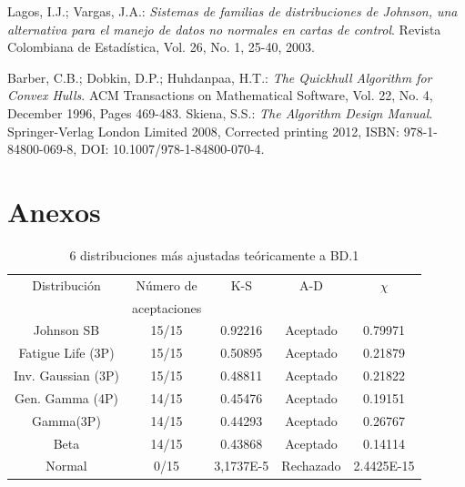 \documentclass[12pt]{report}
\begin{document}
\begin{thebibliography}{9}
{		Lagos, I.J.; Vargas, J.A.:\textit{ Sistemas de familias de distribuciones de Johnson, una alternativa para el manejo de datos no normales en cartas de control}. Revista Colombiana de  Estadística, Vol. 26, No. 1,
		25-40, 2003.
		
		Barber, C.B.; Dobkin, D.P.; Huhdanpaa, H.T.:\textit{ The Quickhull Algorithm for Convex Hulls}. ACM Transactions on Mathematical Software, Vol. 22, No. 4, December 1996, Pages 469-483.
		Skiena, S.S.: \textit{The Algorithm Design Manual}. Springer-Verlag London Limited 2008, Corrected printing 2012, ISBN: 978-1-84800-069-8, DOI: 10.1007/978-1-84800-070-4.
}
\end{thebibliography}


\appendix
\chapter{Anexos}
\begin{table}[h!]
	\centering
	\begin{tabular}{|c|c|c|c|c|}			
											\hline
		Distribución	  &Número de	&K-S	&A-D	& $\chi$  \\
						  &	aceptaciones &     &	 &     \\ \hline
		   Johnson SB     &    15/15    & 0.92216   & 	Aceptado     &0.79971    \\ \hline
		Fatigue Life (3P) &    15/15	& 0.50895    &  Aceptado   	& 0.21879   \\ \hline
		Inv. Gaussian (3P)&    15/15	& 0.48811  	&  Aceptado 	&   0.21822 	\\ \hline 
		Gen. Gamma (4P)   &    14/15	& 0.45476   &   Aceptado	& 0.19151   	\\ \hline
		Gamma(3P)         &   14/15	&     0.44293   &      	Aceptado   &  0.26767  	\\ \hline
		Beta              &   14/15	& 0.43868     &   	Aceptado	& 0.14114    	\\ \hline
				Normal   &   0/15	& 3,1737E-5   &   	Rechazado	& 2.4425E-15	\\ \hline  %
	\end{tabular}
	\caption{6 distribuciones más ajustadas teóricamente a BD.1}
	\label{teo_BD1}
\end{table}
\end{document}
